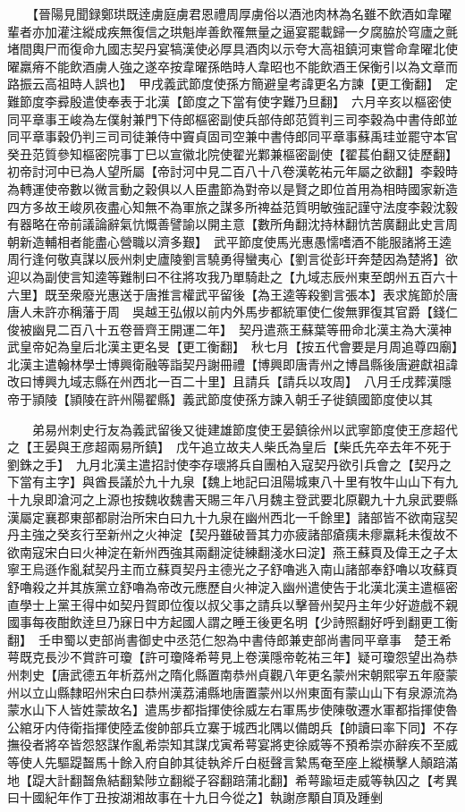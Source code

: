 　　【晉陽見聞録鄭珙既逹虜庭虜君恩禮周厚虜俗以酒池肉林為名雖不飲酒如韋曜輩者亦加灌注縱成疾無復信之珙魁岸善飲罹無量之逼宴罷載歸一夕腐脇於穹廬之氈堵間輿尸而復命九國志契丹宴犒漢使必厚具酒肉以示夸大高祖鎮河東嘗命韋曜北使曜羸瘠不能飲酒虜人強之遂卒按韋曜孫皓時人韋昭也不能飲酒王保衡引以為文章而路振云高祖時人誤也】　甲戌義武節度使孫方簡避皇考諱更名方諫【更工衡翻】　定難節度李彛殷遣使奉表于北漢【節度之下當有使字難乃旦翻】　六月辛亥以樞密使同平章事王峻為左僕射兼門下侍郎樞密副使兵部侍郎范質判三司李穀為中書侍郎並同平章事穀仍判三司司徒兼侍中竇貞固司空兼中書侍郎同平章事蘇禹珪並罷守本官癸丑范質參知樞密院事丁巳以宣徽北院使翟光鄴兼樞密副使【翟萇伯翻又徒歷翻】初帝討河中已為人望所屬【帝討河中見二百八十八卷漢乾祐元年屬之欲翻】李穀時為轉運使帝數以微言動之穀俱以人臣盡節為對帝以是賢之即位首用為相時國家新造四方多故王峻夙夜盡心知無不為軍旅之謀多所禆益范質明敏強記謹守法度李穀沈毅有器略在帝前議論辭氣忼慨善譬諭以開主意【數所角翻沈持林翻忼苦廣翻此史言周朝新造輔相者能盡心營職以濟多艱】　武平節度使馬光惠愚懦嗜酒不能服諸將王逵周行逢何敬真謀以辰州刺史廬陵劉言驍勇得蠻夷心【劉言從彭玕奔楚因為楚將】欲迎以為副使言知逵等難制曰不往將攻我乃單騎赴之【九域志辰州東至朗州五百六十六里】既至衆廢光惠送于唐推言權武平留後【為王逵等殺劉言張本】表求旄節於唐唐人未許亦稱藩于周　吳越王弘俶以前内外馬步都統軍使仁俊無罪復其官爵【錢仁俊被幽見二百八十五卷晉齊王開運二年】　契丹遣燕王蘇葉等冊命北漢主為大漢神武皇帝妃為皇后北漢主更名旻【更工衡翻】　秋七月【按五代會要是月周追尊四廟】北漢主遣翰林學士博興衛融等詣契丹謝冊禮【博興即唐青州之博昌縣後唐避獻祖諱改曰博興九域志縣在州西北一百二十里】且請兵【請兵以攻周】　八月壬戌葬漢隱帝于頴陵【頴陵在許州陽翟縣】義武節度使孫方諫入朝壬子徙鎮國節度使以其

　　弟易州刺史行友為義武留後又徙建雄節度使王晏鎮徐州以武寧節度使王彦超代之【王晏與王彦超兩易所鎮】　戊午追立故夫人柴氏為皇后【柴氏先卒去年不死于劉銖之手】　九月北漢主遣招討使李存瓌將兵自團柏入寇契丹欲引兵會之【契丹之下當有主字】與酋長議於九十九泉【魏上地記曰沮陽城東八十里有牧牛山山下有九十九泉即滄河之上源也按魏收魏書天賜三年八月魏主登武要北原觀九十九泉武要縣漢屬定襄郡東部都尉治所宋白曰九十九泉在幽州西北一千餘里】諸部皆不欲南寇契丹主強之癸亥行至新州之火神淀【契丹雖破晉其力亦疲諸部瘡痍未瘳羸耗未復故不欲南寇宋白曰火神淀在新州西強其兩翻淀徒練翻淺水曰淀】燕王蘇頁及偉王之子太寧王烏遜作亂弑契丹主而立蘇頁契丹主德光之子舒嚕逃入南山諸部奉舒嚕以攻蘇頁舒嚕殺之并其族黨立舒嚕為帝改元應歷自火神淀入幽州遣使告于北漢北漢主遣樞密直學士上黨王得中如契丹賀即位復以叔父事之請兵以擊晉州契丹主年少好遊戲不親國事每夜酣飲逹旦乃寐日中方起國人謂之睡王後更名明【少詩照翻好呼到翻更工衡翻】　壬申蜀以吏部尚書御史中丞范仁恕為中書侍郎兼吏部尚書同平章事　楚王希萼既克長沙不賞許可瓊【許可瓊降希萼見上卷漢隱帝乾祐三年】疑可瓊怨望出為恭州刺史【唐武德五年析荔州之隋化縣置南恭州貞觀八年更名蒙州宋朝熙寜五年廢蒙州以立山縣隸昭州宋白曰恭州漢荔浦縣地唐置蒙州以州東面有蒙山山下有泉源流為蒙水山下人皆姓蒙故名】遣馬步都指揮使徐威左右軍馬步使陳敬遷水軍都指揮使魯公綰牙内侍衛指揮使陸孟俊帥部兵立寨于城西北隅以備朗兵【帥讀曰率下同】不存撫役者將卒皆怨怒謀作亂希崇知其謀戊寅希萼宴將吏徐威等不預希崇亦辭疾不至威等使人先驅踶齧馬十餘入府自帥其徒執斧斤白梃聲言縶馬奄至座上縱横擊人顛踣滿地【踶大計翻齧魚結翻縶陟立翻縱子容翻踣蒲北翻】希萼踰垣走威等執囚之【考異曰十國紀年作丁丑按湖湘故事在十九日今從之】執謝彦顒自頂及踵剉

